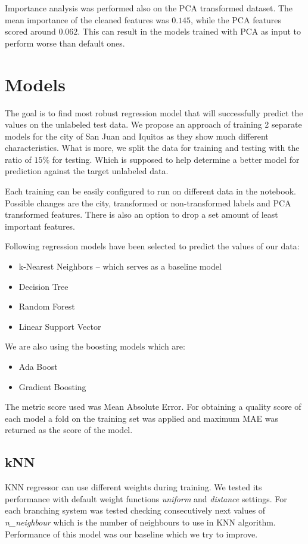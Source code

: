 \documentclass[sigconf]{acmart}
\begin{document}
Importance analysis was performed also on the PCA transformed dataset.
The mean importance of the cleaned features was $0.145$, while the PCA features scored around $0.062$.
This can result in the models trained with PCA as input to perform worse than default ones.

\section{Models}
The goal is to find most robust regression model that will successfully predict the values on the unlabeled test data.
We propose an approach of training 2 separate models for the city of San Juan and Iquitos as they show much different characteristics.
What is more, we split the data for training and testing with the ratio of $15\%$ for testing. Which is supposed to help determine a better model for prediction against the target unlabeled data.

Each training can be easily configured to run on different data in the notebook.
Possible changes are the city, transformed or non-transformed labels and PCA transformed features.
There is also an option to drop a set amount of least important features.

Following regression models have been selected to predict the values of our data:
\begin{itemize}
    \item k-Nearest Neighbors -- which serves as a baseline model
    \item Decision Tree
    \item Random Forest
    \item Linear Support Vector
\end{itemize}

We are also using the boosting models which are:
\begin{itemize}
    \item Ada Boost
    \item Gradient Boosting
\end{itemize}

The metric score used was Mean Absolute Error.
For obtaining a quality score of each model a fold on the training set was applied and maximum MAE was returned as the score of the model.

\subsection{kNN}
KNN regressor can use different weights during training.
We tested its performance with default weight functions \emph{uniform} and \emph{distance} settings.
For each branching system was tested checking consecutively next values of \emph{n\_neighbour} which is the number of  neighbours to use in KNN algorithm.
Performance of this model was our baseline which we try to improve.
\end{document}
